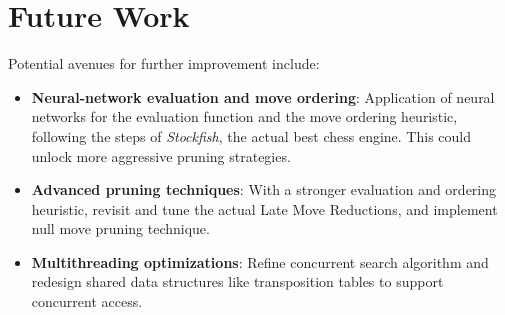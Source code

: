 \section{Future Work}

\noindent Potential avenues for further improvement include:

\begin{itemize}
    \item \textbf{Neural-network evaluation and move ordering}:  
    Application of neural networks for the evaluation function and the move ordering heuristic, following the steps of \textit{Stockfish}, the actual best chess engine. This could unlock more aggressive pruning strategies.
    \item \textbf{Advanced pruning techniques}:  
    With a stronger evaluation and ordering heuristic, revisit and tune the actual Late Move Reductions, and implement null move pruning technique.
    \item \textbf{Multithreading optimizations}:  
    Refine concurrent search algorithm and redesign shared data structures like transposition tables to support concurrent access.
\end{itemize}
